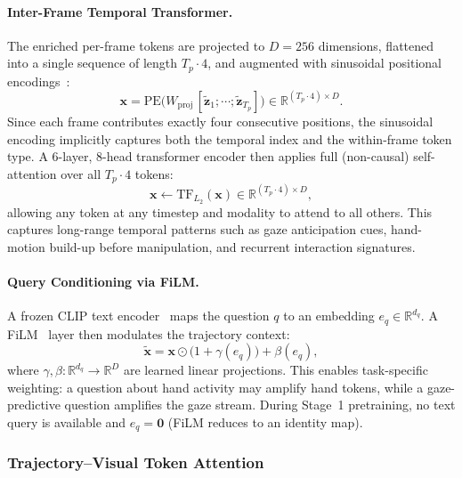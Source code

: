 \paragraph{Inter-Frame Temporal Transformer.}
The enriched per-frame tokens are projected to $D{=}256$ dimensions,
flattened into a single sequence of length $T_p \cdot 4$,
and augmented with sinusoidal positional encodings~\cite{vaswani2017attention}:
\begin{equation}
    \mathbf{x} = \mathrm{PE}\!\bigl(
        W_{\mathrm{proj}}\,[\tilde{\mathbf{z}}_1;\cdots;\tilde{\mathbf{z}}_{T_p}]
    \bigr) \in \mathbb{R}^{(T_p \cdot 4) \times D}.
\end{equation}
Since each frame contributes exactly four consecutive positions, the sinusoidal encoding
implicitly captures both the temporal index and the within-frame token type.
A 6-layer, 8-head transformer encoder then applies full (non-causal) self-attention
over all $T_p \cdot 4$ tokens:
\begin{equation}
    \mathbf{x} \leftarrow \mathrm{TF}_{L_2}(\mathbf{x}) \in \mathbb{R}^{(T_p \cdot 4) \times D},
    \label{eq:inter_frame}
\end{equation}
allowing any token at any timestep and modality to attend to all others.
This captures long-range temporal patterns such as gaze anticipation cues,
hand-motion build-up before manipulation, and recurrent interaction signatures.

\paragraph{Query Conditioning via FiLM.}
A frozen CLIP text encoder~\cite{radford2021clip} maps the question $q$ to an
embedding $e_q \in \mathbb{R}^{d_q}$.
A FiLM~\cite{perez2018film} layer then modulates the trajectory context:
\begin{equation}
    \tilde{\mathbf{x}} = \mathbf{x} \odot \bigl(1 + \gamma(e_q)\bigr) + \beta(e_q),
    \label{eq:film}
\end{equation}
where $\gamma, \beta : \mathbb{R}^{d_q} \to \mathbb{R}^D$ are learned linear projections.
This enables task-specific weighting: a question about hand activity may amplify hand tokens,
while a gaze-predictive question amplifies the gaze stream.
During Stage~1 pretraining, no text query is available and $e_q = \mathbf{0}$
(FiLM reduces to an identity map).


\subsubsection{Trajectory--Visual Token Attention}
\label{sec:vt_fusion}

